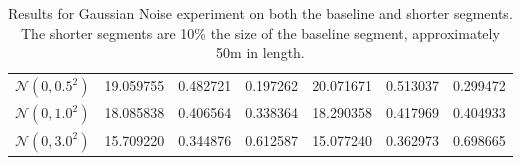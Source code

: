 \begin{table}[H]
\begin{tabular}{l | C{2.2} C{1.3} C{1.3} | C{2.2} C{1.3} C{1.3}}
$\mathcal{N}(0, 0.5^2)$ & 19.059755 & 0.482721 & 0.197262 & 20.071671 & 0.513037 & 0.299472 \\ 
$\mathcal{N}(0, 1.0^2)$ & 18.085838 & 0.406564 & 0.338364 & 18.290358 & 0.417969 & 0.404933 \\ 
$\mathcal{N}(0, 3.0^2)$ & 15.709220 & 0.344876 & 0.612587 & 15.077240 & 0.362973 & 0.698665 \\ 
\hline
\end{tabular}
\caption{Results for Gaussian Noise experiment on both the baseline and shorter segments. The shorter segments are 10\% the size of the baseline segment, approximately 50m in length.}
\label{tab:exp-gaussian-noise-full}
\end{table}